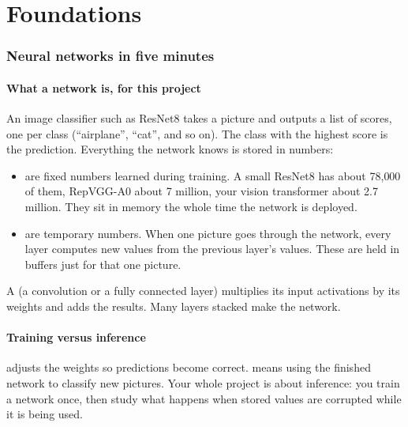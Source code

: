 \part{Foundations}

\section{Neural networks in five minutes}

\subsection{What a network is, for this project}
An image classifier such as ResNet8 takes a picture and outputs a list of scores, one per class
(``airplane'', ``cat'', and so on). The class with the highest score is the prediction. Everything the
network knows is stored in numbers:
\begin{itemize}
\item {} are fixed numbers learned during training. A small ResNet8 has about 78{,}000 of them,
 RepVGG-A0 about 7 million, your vision transformer about 2.7 million. They sit in memory the whole time
 the network is deployed.
\item {} are temporary numbers. When one picture goes through the network, every layer
 computes new values from the previous layer's values. These are held in buffers just for that one picture.
\end{itemize}
A  (a convolution or a fully connected layer) multiplies its input activations by its weights
and adds the results. Many layers stacked make the network.

\subsection{Training versus inference}
 adjusts the weights so predictions become correct.  means using the finished
network to classify new pictures. Your whole project is about inference: you train a network once, then
study what happens when stored values are corrupted while it is being used.

